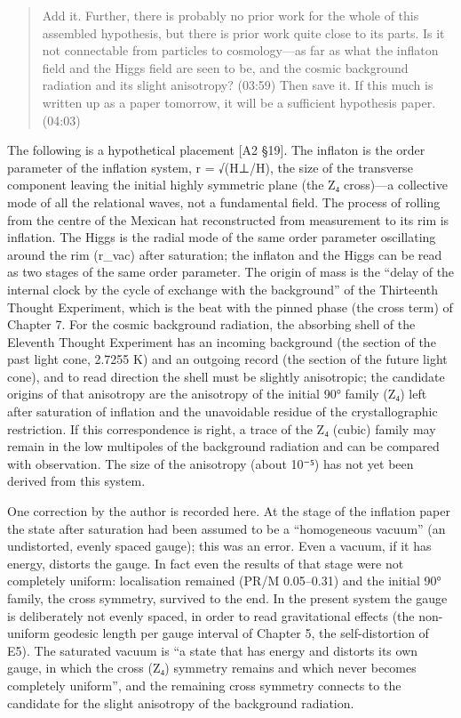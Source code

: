 \documentclass[
  a4paper,
]{article}
\begin{document}
\begin{quote}
Add it. Further, there is probably no prior work for the whole of this
assembled hypothesis, but there is prior work quite close to its parts.
Is it not connectable from particles to cosmology---as far as what the
inflaton field and the Higgs field are seen to be, and the cosmic
background radiation and its slight anisotropy? (03:59) Then save it. If
this much is written up as a paper tomorrow, it will be a sufficient
hypothesis paper. (04:03)
\end{quote}

The following is a hypothetical placement {[}A2 §19{]}. The inflaton is
the order parameter of the inflation system, r = √(H⊥/H), the size of
the transverse component leaving the initial highly symmetric plane (the
Z₄ cross)---a collective mode of all the relational waves, not a
fundamental field. The process of rolling from the centre of the Mexican
hat reconstructed from measurement to its rim is inflation. The Higgs is
the radial mode of the same order parameter oscillating around the rim
(r\_vac) after saturation; the inflaton and the Higgs can be read as two
stages of the same order parameter. The origin of mass is the ``delay of
the internal clock by the cycle of exchange with the background'' of the
Thirteenth Thought Experiment, which is the beat with the pinned phase
(the cross term) of Chapter 7. For the cosmic background radiation, the
absorbing shell of the Eleventh Thought Experiment has an incoming
background (the section of the past light cone, 2.7255 K) and an
outgoing record (the section of the future light cone), and to read
direction the shell must be slightly anisotropic; the candidate origins
of that anisotropy are the anisotropy of the initial 90° family (Z₄)
left after saturation of inflation and the unavoidable residue of the
crystallographic restriction. If this correspondence is right, a trace
of the Z₄ (cubic) family may remain in the low multipoles of the
background radiation and can be compared with observation. The size of
the anisotropy (about 10⁻⁵) has not yet been derived from this system.

One correction by the author is recorded here. At the stage of the
inflation paper the state after saturation had been assumed to be a
``homogeneous vacuum'' (an undistorted, evenly spaced gauge); this was
an error. Even a vacuum, if it has energy, distorts the gauge. In fact
even the results of that stage were not completely uniform: localisation
remained (PR/M 0.05--0.31) and the initial 90° family, the cross
symmetry, survived to the end. In the present system the gauge is
deliberately not evenly spaced, in order to read gravitational effects
(the non-uniform geodesic length per gauge interval of Chapter 5, the
self-distortion of E5). The saturated vacuum is ``a state that has
energy and distorts its own gauge, in which the cross (Z₄) symmetry
remains and which never becomes completely uniform'', and the remaining
cross symmetry connects to the candidate for the slight anisotropy of
the background radiation.
\end{document}
